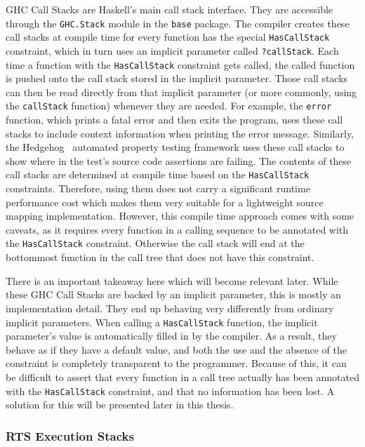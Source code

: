 \documentclass[fontsize=11pt,a4paper,parskip=half,numbers=noenddot]{scrartcl}
\newcommand{\hask}[1]{\texttt{#1}}
\begin{document}
GHC Call Stacks are Haskell's main call stack interface. They are accessible
through the \hask{GHC.Stack} module in the \texttt{base} package. The compiler
creates these call stacks at compile time for every function has the special
\hask{HasCallStack} constraint, which in turn uses an implicit parameter called
\hask{?callStack}. Each time a function with the \hask{HasCallStack} constraint
gets called, the called function is pushed onto the call stack stored in the
implicit parameter. Those call stacks can then be read directly from that
implicit parameter (or more commonly, using the \hask{callStack} function)
whenever they are needed. For example, the \hask{error} function, which prints a
fatal error and then exits the program, uses these call stacks to include
context information when printing the error message. Similarly, the
Hedgehog~\cite{hedgehog} automated property testing framework uses these call
stacks to show where in the test's source code assertions are failing. The
contents of these call stacks are determined at compile time based on the
\hask{HasCallStack} constraints. Therefore, using them does not carry a
significant runtime performance cost which makes them very suitable for a
lightweight source mapping implementation. However, this compile time approach
comes with some caveats, as it requires every function in a calling sequence to
be annotated with the \hask{HasCallStack} constraint. Otherwise the call stack
will end at the bottommost function in the call tree that does not have this
constraint.

There is an important takeaway here which will become relevant later. While
these GHC Call Stacks are backed by an implicit parameter, this is mostly an
implementation detail. They end up behaving very differently from ordinary
implicit parameters. When calling a \hask{HasCallStack} function, the implicit
parameter's value is automatically filled in by the compiler. As a result, they
behave as if they have a default value, and both the use and the absence of the
constraint is completely transparent to the programmer. Because of this, it can
be difficult to assert that every function in a call tree actually has been
annotated with the \hask{HasCallStack} constraint, and that no information has
been lost. A solution for this will be presented later in this thesis.

\subsubsection{RTS Execution Stacks}\label{sec:rts-execution-stacks}
\end{document}
